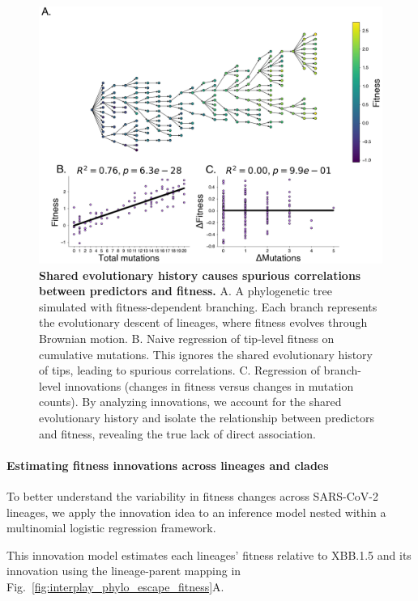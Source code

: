 \begin{figure}[h]
    \centering
    \includegraphics[width=1.0\textwidth]{./figures/synthetic-spurious-correlations.png}
    \caption{
	\textbf{Shared evolutionary history causes spurious correlations between predictors and fitness.}
	A. A phylogenetic tree simulated with fitness-dependent branching.
	Each branch represents the evolutionary descent of lineages, where fitness evolves through Brownian motion.
	B. Naive regression of tip-level fitness on cumulative mutations.
	This ignores the shared evolutionary history of tips, leading to spurious correlations.
	C. Regression of branch-level innovations (changes in fitness versus changes in mutation counts).
	By analyzing innovations, we account for the shared evolutionary history and isolate the relationship between predictors and fitness, revealing the true lack of direct association.
    }
    \label{fig:shared_history_spurious_correlation}
\end{figure}


\paragraph{Estimating fitness innovations across lineages and clades}

To better understand the variability in fitness changes across SARS-CoV-2 lineages, we apply the innovation idea to an inference model nested within a multinomial logistic regression framework.

This innovation model estimates each lineages' fitness relative to XBB.1.5 and its innovation using the lineage-parent mapping in Fig.~\ref{fig:interplay_phylo_escape_fitness}A.

